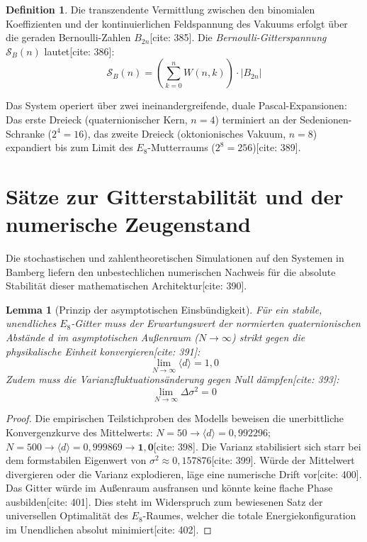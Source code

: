 \documentclass[11pt,a4paper]{article}
\newcommand{\Eoct}{E_8}
\newtheorem{lemma}[theorem]{Lemma}
\theoremstyle{definition}
\newtheorem{definition}[theorem]{Definition}
\begin{document}
	\begin{definition}
		Die transzendente Vermittlung zwischen den binomialen Koeffizienten und der kontinuierlichen Feldspannung des Vakuums erfolgt über die geraden Bernoulli-Zahlen $B_{2n}$[cite: 385]. Die \textit{Bernoulli-Gitterspannung} $\mathcal{S}_B(n)$ lautet[cite: 386]:
		\begin{equation}
			\mathcal{S}_B(n) = \left( \sum_{k=0}^n W(n,k) \right) \cdot |B_{2n}|
		\end{equation}
	\end{definition}
	
	Das System operiert über zwei ineinandergreifende, duale Pascal-Expansionen: Das erste Dreieck (quaternionischer Kern, $n=4$) terminiert an der Sedenionen-Schranke ($2^4=16$), das zweite Dreieck (oktonionisches Vakuum, $n=8$) expandiert bis zum Limit des $E_8$-Mutterraums ($2^8=256$)[cite: 389].
	
	\section{Sätze zur Gitterstabilität und der numerische Zeugenstand}
	
	Die stochastischen und zahlentheoretischen Simulationen auf den Systemen in Bamberg liefern den unbestechlichen numerischen Nachweis für die absolute Stabilität dieser mathematischen Architektur[cite: 390].
	
	\begin{lemma}[Prinzip der asymptotischen Einsbündigkeit]
		Für ein stabile, unendliches $\Eoct$-Gitter muss der Erwartungswert der normierten quaternionischen Abstände $d$ im asymptotischen Außenraum ($N \rightarrow \infty$) strikt gegen die physikalische Einheit konvergieren[cite: 391]:
		\begin{equation}
			\lim_{N \rightarrow \infty} \langle d \rangle = 1{,}0
		\end{equation}
		Zudem muss die Varianzfluktuationsänderung gegen Null dämpfen[cite: 393]:
		\begin{equation}
			\lim_{N \rightarrow \infty} \Delta \sigma^2 = 0
		\end{equation}
	\end{lemma}
	
	\begin{proof}
		Die empirischen Teilstichproben des Modells beweisen die unerbittliche Konvergenzkurve des Mittelwerts: $N=50 \rightarrow \langle d \rangle = 0{,}992296$; $N=500 \rightarrow \langle d \rangle = 0{,}999869 \rightarrow \mathbf{1{,}0}$[cite: 398]. Die Varianz stabilisiert sich starr bei dem formstabilen Eigenwert von $\sigma^2 \approx 0{,}157876$[cite: 399]. Würde der Mittelwert divergieren oder die Varianz explodieren, läge eine numerische Drift vor[cite: 400]. Das Gitter würde im Außenraum ausfransen und könnte keine flache Phase ausbilden[cite: 401]. Dies steht im Widerspruch zum bewiesenen Satz der universellen Optimalität des $\Eoct$-Raumes, welcher die totale Energiekonfiguration im Unendlichen absolut minimiert[cite: 402].
	\end{proof}
	
\end{document}
